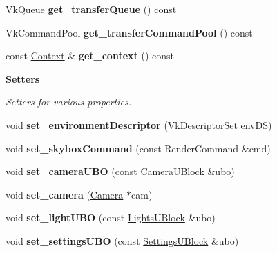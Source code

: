 \begin{Indent}
\begin{DoxyCompactItemize}
\mbox{\label{classblaze_1_1ForwardRenderer_adc1a5b6c9a65095ff8522700299bf01f}} 
Vk\+Queue {\bfseries get\+\_\+transfer\+Queue} () const
\item 
\mbox{\label{classblaze_1_1ForwardRenderer_a621f7347a28af51ab7cd058a0d87526d}} 
Vk\+Command\+Pool {\bfseries get\+\_\+transfer\+Command\+Pool} () const
\item 
\mbox{\label{classblaze_1_1ForwardRenderer_a4e4c901e8abac21a3004cb21efe76ffa}} 
const \hyperlink{classblaze_1_1Context}{Context} \& {\bfseries get\+\_\+context} () const
\end{DoxyCompactItemize}
\end{Indent}
\begin{Indent}\textbf{ Setters}\par
{\em Setters for various properties. }\begin{DoxyCompactItemize}
\item 
\mbox{\label{classblaze_1_1ForwardRenderer_aa3efcc09e6fa7bd7d24852e1604dc74a}} 
void {\bfseries set\+\_\+environment\+Descriptor} (Vk\+Descriptor\+Set env\+DS)
\item 
\mbox{\label{classblaze_1_1ForwardRenderer_a350c02de6852b53cd716d2bd658ae6ba}} 
void {\bfseries set\+\_\+skybox\+Command} (const Render\+Command \&cmd)
\item 
\mbox{\label{classblaze_1_1ForwardRenderer_ad803f802a4c790f3eace6478b40ada10}} 
void {\bfseries set\+\_\+camera\+U\+BO} (const \hyperlink{structblaze_1_1CameraUBlock}{Camera\+U\+Block} \&ubo)
\item 
\mbox{\label{classblaze_1_1ForwardRenderer_aee7c41ff828dca60051e49b512621bb4}} 
void {\bfseries set\+\_\+camera} (\hyperlink{classblaze_1_1Camera}{Camera} $\ast$cam)
\item 
\mbox{\label{classblaze_1_1ForwardRenderer_a9859c881ae01d21f8b9be2660d8b02bc}} 
void {\bfseries set\+\_\+light\+U\+BO} (const \hyperlink{structblaze_1_1LightsUBlock}{Lights\+U\+Block} \&ubo)
\item 
\mbox{\label{classblaze_1_1ForwardRenderer_ac70cb2eea41211cf964e883cfe663e9b}} 
void {\bfseries set\+\_\+settings\+U\+BO} (const \hyperlink{structblaze_1_1SettingsUBlock}{Settings\+U\+Block} \&ubo)
\end{DoxyCompactItemize}
\end{Indent}
